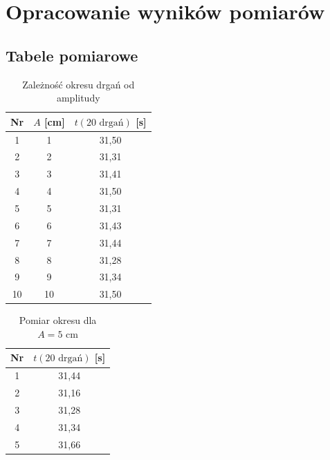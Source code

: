\documentclass[a4paper,12pt]{article}
\begin{document}
\section{Opracowanie wyników pomiarów}

\subsection{Tabele pomiarowe}




\begin{table}[H]
    \centering
    \begin{tabular}{|c|c|c|}
        \hline
        Nr & $A$ [cm] & $t(20 \text{ drgań})$ [s] \\
        \hline
        1  & 1 & 31,50 \\
        2  & 2 & 31,31 \\
        3  & 3 & 31,41 \\
        4  & 4 & 31,50 \\
        5  & 5 & 31,31 \\
        6  & 6 & 31,43 \\
        7  & 7 & 31,44 \\
        8  & 8 & 31,28 \\
        9  & 9 & 31,34 \\
        10 & 10 & 31,50 \\
        \hline
    \end{tabular}
    \caption{Zależność okresu drgań od amplitudy}
\end{table}

\begin{table}[H]
    \centering
    \begin{tabular}{|c|c|}
        \hline
        Nr & $t(20 \text{ drgań})$ [s] \\
        \hline
        1 & 31,44 \\
        2 & 31,16 \\
        3 & 31,28 \\
        4 & 31,34 \\
        5 & 31,66 \\
        \hline
    \end{tabular}
    \caption{Pomiar okresu dla $A = 5 \text{ cm}$}
    \label{tab:okres_5cm}
\end{table}
\end{document}
